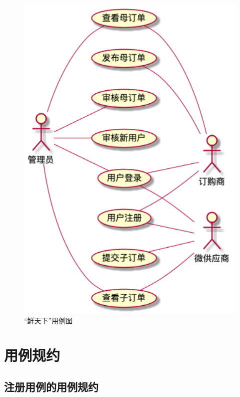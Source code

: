 \begin{figure}[htp]
    \centering
    \includegraphics[width=12cm]{figure/usecase/uc_main_ver2.png}
    \caption{“鲜天下”用例图}
    \label{fig:usecase-main}
\end{figure}


\section{用例规约}

\subsection{注册用例的用例规约}


